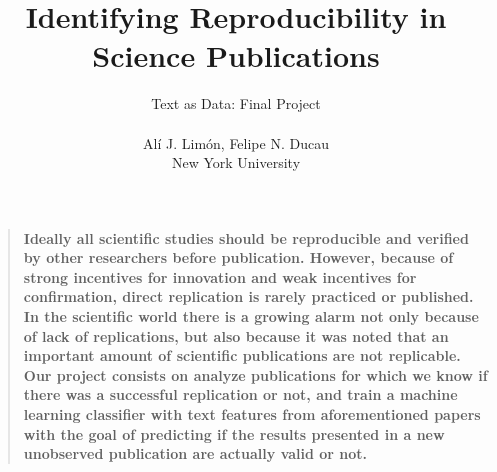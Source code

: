\documentclass[12pt]{article}
\title{Identifying Reproducibility in Science Publications}
\author
{Text as Data: Final Project \\
\\
Al\'i J. Lim\'on, Felipe N. Ducau\\
\normalsize{New York University}\\
}
\date{}
\newenvironment{sciabstract}{%
\begin{quote} \bf}
{\end{quote}}
\begin{document}
 


\baselineskip24pt


\maketitle 




\begin{sciabstract}
  Ideally all scientific studies should be reproducible and verified by other researchers before publication. However, because of strong incentives for innovation and weak incentives for confirmation, direct replication is rarely practiced or published. In the scientific world there is a growing alarm not only because of lack of replications, but also because it was noted that an important amount of scientific publications are not replicable.  Our project consists on analyze publications for which we know if there was a successful replication or not, and train a machine learning classifier with text features from aforementioned papers with the goal of predicting if the results presented in a new unobserved publication are actually valid or not. 
\end{sciabstract}



\end{document}
